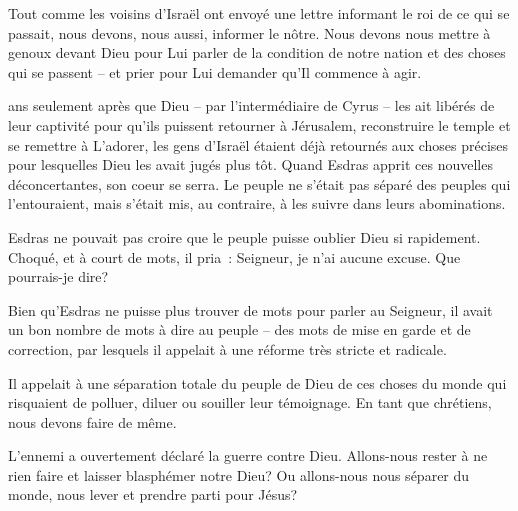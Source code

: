 Tout comme les voisins d'Israël ont envoyé une lettre informant
 le roi de ce qui se passait, nous devons, nous aussi, informer le nôtre.
 Nous devons nous mettre à genoux devant Dieu pour Lui parler de la condition
 de notre nation et des choses qui se passent -- et prier pour Lui demander
 qu'Il commence à agir. 

\dvrule







 ans seulement après que Dieu
 -- par l'intermédiaire de Cyrus -- les ait libérés de leur captivité
 pour qu'ils puissent retourner à Jérusalem,
 reconstruire le temple et se remettre à L'adorer,
 les gens d'Israël étaient déjà retournés aux choses précises
 pour lesquelles Dieu les avait jugés plus tôt.
 Quand Esdras apprit ces nouvelles déconcertantes, son coeur se serra.
 Le peuple ne s'était pas séparé des peuples qui l'entouraient,
 mais s'était mis, au contraire, à les suivre dans leurs abominations.

Esdras ne pouvait pas croire que le peuple puisse oublier Dieu si rapidement.
 Choqué, et à court de mots, il pria~: \og Seigneur, je n'ai aucune excuse.
 Que pourrais-je dire? \fg{}

Bien qu'Esdras ne puisse plus trouver de mots pour parler au Seigneur,
 il avait un bon nombre de mots à dire au peuple -- des mots de mise en garde
 et de correction, par lesquels il appelait à une réforme très stricte
 et radicale.

Il appelait à une séparation totale du peuple de Dieu de ces choses du monde
 qui risquaient de polluer, diluer ou souiller leur témoignage.
 En tant que chrétiens, nous devons faire de même. 



L'ennemi a ouvertement déclaré la guerre contre Dieu.
 Allons-nous rester à ne rien faire et laisser blasphémer notre Dieu?
 Ou allons-nous nous séparer du monde, nous lever et prendre parti pour Jésus? 

